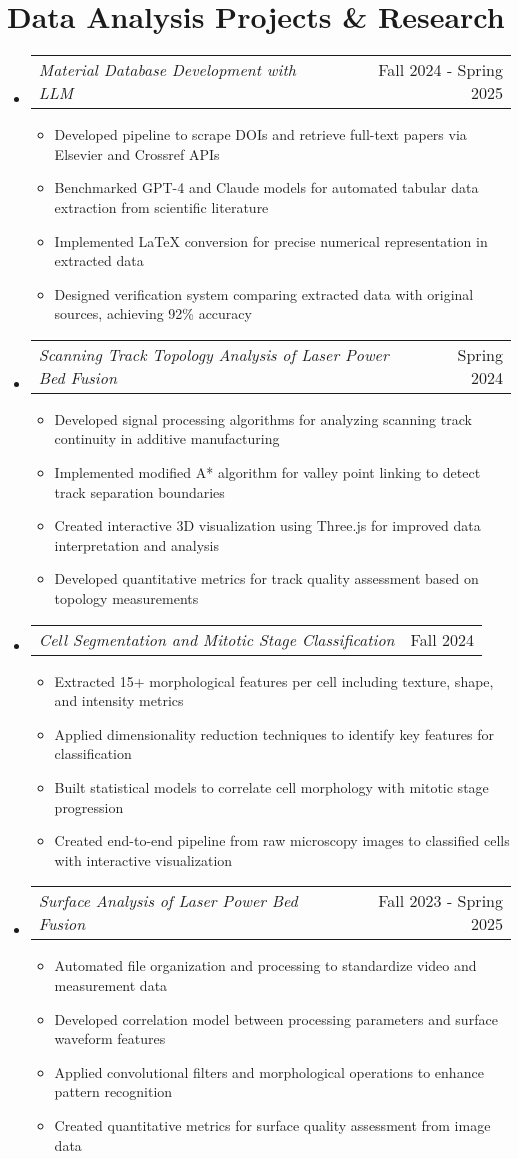 \documentclass[a4paper,11pt]{article}
\makeatletter
\newcommand{\resumeItem}[1]{
  \item\small{
    {#1 \vspace{-2pt}}
  }
}
\newcommand{\resumeSubheading}[2]{
  \vspace{-2pt}\item
    \begin{tabular*}{0.97\textwidth}[t]{l@{\extracolsep{\fill}}r}
      \textit{\small#1} & {\small #2} \\
    \end{tabular*}\vspace{-5pt}
}
\newcommand{\resumeSubHeadingListStart}{\begin{itemize}[leftmargin=0.15in, label={}]}
\newcommand{\resumeSubHeadingListEnd}{\end{itemize}}
\newcommand{\resumeItemListStart}{\begin{itemize}}
\newcommand{\resumeItemListEnd}{\end{itemize}\vspace{-5pt}}
\makeatother
\begin{document}

\section{Data Analysis Projects \& Research}
  \resumeSubHeadingListStart
    \resumeSubheading
      {Material Database Development with LLM}{Fall 2024 - Spring 2025}
        \resumeItemListStart
            \resumeItem{Developed pipeline to scrape DOIs and retrieve full-text papers via Elsevier and Crossref APIs}
            \resumeItem{Benchmarked GPT-4 and Claude models for automated tabular data extraction from scientific literature}
            \resumeItem{Implemented LaTeX conversion for precise numerical representation in extracted data}
            \resumeItem{Designed verification system comparing extracted data with original sources, achieving 92\% accuracy}
        \resumeItemListEnd
        
    \resumeSubheading
      {Scanning Track Topology Analysis of Laser Power Bed Fusion}{Spring 2024}
        \resumeItemListStart
            \resumeItem{Developed signal processing algorithms for analyzing scanning track continuity in additive manufacturing}
            \resumeItem{Implemented modified A* algorithm for valley point linking to detect track separation boundaries}
            \resumeItem{Created interactive 3D visualization using Three.js for improved data interpretation and analysis}
            \resumeItem{Developed quantitative metrics for track quality assessment based on topology measurements}
        \resumeItemListEnd
    
    \resumeSubheading
      {Cell Segmentation and Mitotic Stage Classification}{Fall 2024}
        \resumeItemListStart
            \resumeItem{Extracted 15+ morphological features per cell including texture, shape, and intensity metrics}
            \resumeItem{Applied dimensionality reduction techniques to identify key features for classification}
            \resumeItem{Built statistical models to correlate cell morphology with mitotic stage progression}
            \resumeItem{Created end-to-end pipeline from raw microscopy images to classified cells with interactive visualization}
        \resumeItemListEnd
      
    \resumeSubheading
      {Surface Analysis of Laser Power Bed Fusion}{Fall 2023 - Spring 2025}
        \resumeItemListStart
            \resumeItem{Automated file organization and processing to standardize video and measurement data}
            \resumeItem{Developed correlation model between processing parameters and surface waveform features}
            \resumeItem{Applied convolutional filters and morphological operations to enhance pattern recognition}
            \resumeItem{Created quantitative metrics for surface quality assessment from image data}
        \resumeItemListEnd
  \resumeSubHeadingListEnd
\end{document}

